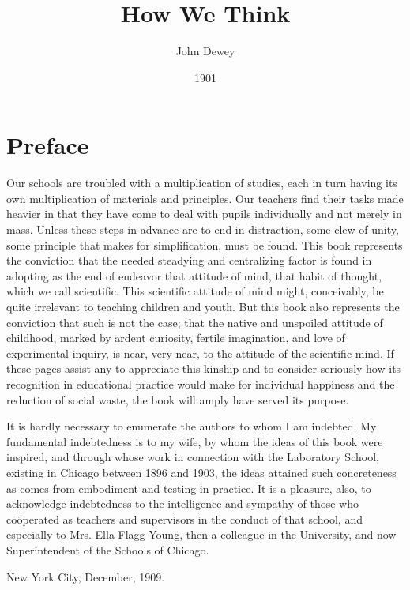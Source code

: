 \documentclass[showtrims,ustradepaper]{memoir}
\title{How We Think}
\author{John Dewey}
\date{1901}
\begin{document}
\frontmatter
\maketitle
\pagestyle{plain}

\chapter{Preface}

Our schools are troubled with a multiplication of studies, each in turn
having its own multiplication of materials and principles. Our teachers
find their tasks made heavier in that they have come to deal with pupils
individually and not merely in mass. Unless these steps in advance are
to end in distraction, some clew of unity, some principle that makes for
simplification, must be found. This book represents the conviction that
the needed steadying and centralizing factor is found in adopting as the
end of endeavor that attitude of mind, that habit of thought, which we
call scientific. This scientific attitude of mind might, conceivably, be
quite irrelevant to teaching children and youth. But this book also
represents the conviction that such is not the case; that the native and
unspoiled attitude of childhood, marked by ardent curiosity, fertile
imagination, and love of experimental inquiry, is near, very near, to
the attitude of the scientific mind. If these pages assist any to
appreciate this kinship and to consider seriously how its recognition in
educational practice would make for individual happiness and the
reduction of social waste, the book will amply have served its purpose.

It is hardly necessary to enumerate the authors to whom I am indebted.
My fundamental indebtedness is to my wife, by whom the ideas of this
book were inspired, and through whose work in connection with the
Laboratory School, existing in Chicago between 1896 and 1903, the ideas
attained such concreteness as comes from embodiment and testing in
practice. It is a pleasure, also, to acknowledge indebtedness to the
intelligence and sympathy of those who coöperated as teachers and
supervisors in the conduct of that school, and especially to Mrs. Ella
Flagg Young, then a colleague in the University, and now Superintendent
of the Schools of Chicago.

{New York City}, December, 1909.

\newpage

\setcounter{tocdepth}{2}
\tableofcontents
\end{document}
